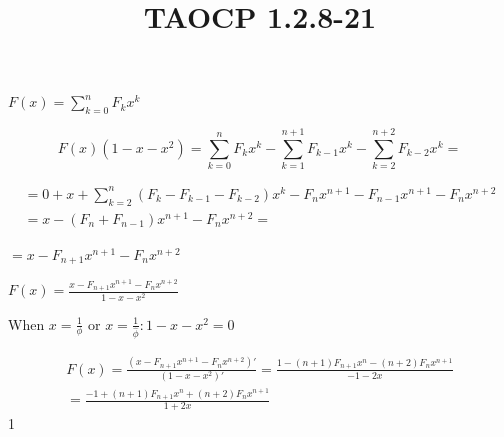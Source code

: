\documentclass{article}
\title{TAOCP 1.2.8\mbox{-}21}
\begin{document}
\maketitle

\( F(x) = \sum_{k=0}^{n} F_{k}x^{k} \)

\[ F(x)(1-x-x^{2}) = \sum_{k=0}^{n} F_{k}x^{k} - \sum_{k=1}^{n+1} F_{k-1}x^{k} - \sum_{k=2}^{n+2} F_{k-2}x^{k} = \]

\begin{multline*}
= 0 + x + \sum_{k=2}^{n}(F_{k} - F_{k-1}-F_{k-2})x^{k} - F_{n}x^{n+1} - F_{n-1}x^{n+1} - F_{n}x^{n+2} \\
= x - (F_{n}+F_{n-1})x^{n+1} - F_{n}x^{n+2} =
\end{multline*}

\( = x - F_{n+1}x^{n+1} - F_{n}x^{n+2} \)

\( F(x) = \frac{x-F_{n+1}x^{n+1}-F_{n}x^{n+2}}{1-x-x^{2}} \)

When \( x = \frac{1}{\phi} \) or \( x = \frac{1}{\hat\phi}: 1-x-x^{2} = 0 \)

\begin{multline*}
F(x) = \frac{(x-F_{n+1}x^{n+1}-F_{n}x^{n+2})'}{(1-x-x^{2})'} = \frac{1-(n+1)F_{n+1}x^{n} -(n+2)F_{n}x^{n+1}}{-1-2x} \\
= \frac{-1+(n+1)F_{n+1}x^{n}+(n+2)F_{n}x^{n+1}}{1+2x}
\end{multline*}
1
\end{document}
